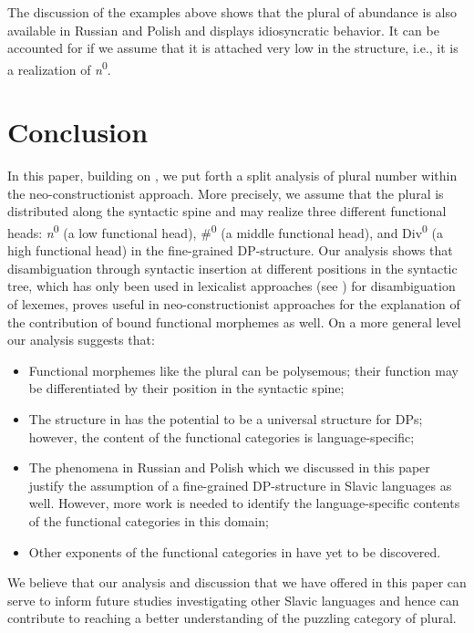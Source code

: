 \documentclass[output=paper,colorlinks,citecolor=brown,
]{langscibook}
\begin{document}
\noindent The discussion of the examples above shows that the plural of abundance is also available in Russian and Polish and displays idiosyncratic behavior. It can be accounted for if we assume that it is attached very low in the structure, i.e., it is a realization of \textit{n}\textsuperscript{0}.  


\section{Conclusion}\label{sec:5}

In this paper, building on \citet{Mathieu2014}, we put forth a split analysis of plural number within the neo-constructionist approach. More precisely, we assume that the plural is distributed along the syntactic spine and may realize three different functional heads: \textit{n}\textsuperscript{0} (a low functional head), \#\textsuperscript{0} (a middle functional head), and Div\textsuperscript{0} (a high functional head) in the fine-grained DP-structure. Our analysis shows that disambiguation through syntactic insertion at different positions in the syntactic tree, which has only been used in lexicalist approaches (see \citealt{Zimmermann2008}) for disambiguation of lexemes, proves useful in neo-constructionist approaches for the explanation of the contribution of bound functional morphemes as well. On a more general level our analysis suggests that: 

\begin{itemize}
  \item Functional morphemes like the plural can be polysemous; their function may be differentiated by their position in the syntactic spine;
  \item The structure in  has the potential to be a universal structure for DPs; however, the content of the functional categories is language-specific;
  \item The phenomena in Russian and Polish which we discussed in this paper justify the assumption of a fine-grained DP-structure in Slavic languages as well. However, more work is needed to identify the language-specific contents of the functional categories in this domain; 
  \item Other exponents of the functional categories in  have yet to be discovered. 
\end{itemize}
	
We believe that our analysis and discussion that we have offered in this paper can serve to inform future studies investigating other Slavic languages and hence can contribute to reaching a better understanding of the puzzling category of plural.
\end{document}
